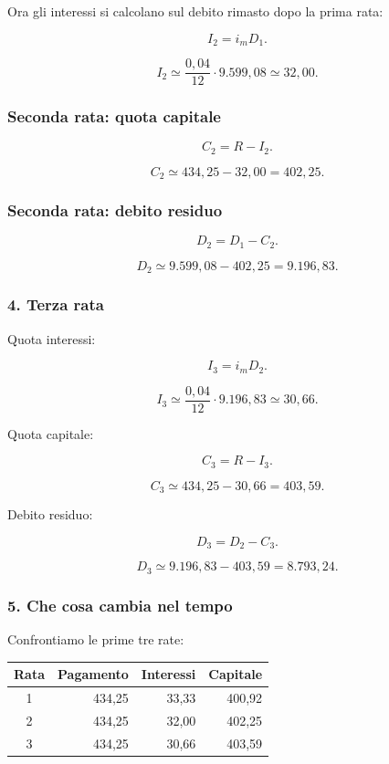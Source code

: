 \noindent Ora gli interessi si calcolano
sul debito rimasto dopo la prima rata:

\[
I_2=i_mD_1.
\]

\[
I_2
\simeq
\frac{0{,}04}{12}\cdot9.599{,}08
\simeq
\boxed{32{,}00}.
\]


\subsubsection*{Seconda rata: quota capitale}

\[
C_2=R-I_2.
\]

\[
C_2
\simeq
434{,}25-32{,}00
=
\boxed{402{,}25}.
\]


\subsubsection*{Seconda rata: debito residuo}

\[
D_2=D_1-C_2.
\]

\[
D_2
\simeq
9.599{,}08-402{,}25
=
\boxed{9.196{,}83}.
\]


\subsubsection*{4. Terza rata}

\noindent Quota interessi:

\[
I_3=i_mD_2.
\]

\[
I_3
\simeq
\frac{0{,}04}{12}\cdot9.196{,}83
\simeq
\boxed{30{,}66}.
\]

\noindent Quota capitale:

\[
C_3=R-I_3.
\]

\[
C_3
\simeq
434{,}25-30{,}66
=
\boxed{403{,}59}.
\]

\noindent Debito residuo:

\[
D_3=D_2-C_3.
\]

\[
D_3
\simeq
9.196{,}83-403{,}59
=
\boxed{8.793{,}24}.
\]


\subsubsection*{5. Che cosa cambia nel tempo}

\noindent Confrontiamo le prime tre rate:

\begin{center}
    \begin{tabular}{|c|r|r|r|}
        \hline
        \textbf{Rata}
        & \textbf{Pagamento}
        & \textbf{Interessi}
        & \textbf{Capitale} \\
        \hline
        1 & 434,25 & 33,33 & 400,92 \\
        2 & 434,25 & 32,00 & 402,25 \\
        3 & 434,25 & 30,66 & 403,59 \\
        \hline
    \end{tabular}
\end{center}

